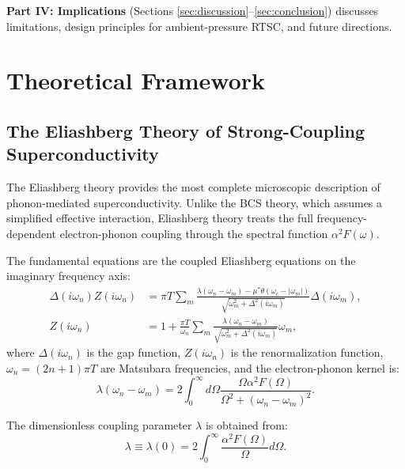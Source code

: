 \documentclass[11pt,a4paper]{article}
\theoremstyle{definition}
\begin{document}
\textbf{Part IV: Implications} (Sections \ref{sec:discussion}--\ref{sec:conclusion}) discusses limitations, design principles for ambient-pressure RTSC, and future directions.

\section{Theoretical Framework}\label{sec:theory}

\subsection{The Eliashberg Theory of Strong-Coupling Superconductivity}

The Eliashberg theory \cite{eliashberg1960,eliashberg1960b} provides the most complete microscopic description of phonon-mediated superconductivity. Unlike the BCS theory, which assumes a simplified effective interaction, Eliashberg theory treats the full frequency-dependent electron-phonon coupling through the spectral function $\alpha^2F(\omega)$.

The fundamental equations are the coupled Eliashberg equations on the imaginary frequency axis:
\begin{align}
\Delta(i\omega_n)Z(i\omega_n) &= \pi T \sum_m \frac{\lambda(\omega_n - \omega_m) - \mu^*\theta(\omega_c - |\omega_m|)}{\sqrt{\omega_m^2 + \Delta^2(i\omega_m)}} \Delta(i\omega_m), \label{eq:eliashberg1}\\
Z(i\omega_n) &= 1 + \frac{\pi T}{\omega_n} \sum_m \frac{\lambda(\omega_n - \omega_m)}{\sqrt{\omega_m^2 + \Delta^2(i\omega_m)}} \omega_m, \label{eq:eliashberg2}
\end{align}
where $\Delta(i\omega_n)$ is the gap function, $Z(i\omega_n)$ is the renormalization function, $\omega_n = (2n+1)\pi T$ are Matsubara frequencies, and the electron-phonon kernel is:
\begin{equation}\label{eq:lambda_omega}
\lambda(\omega_n - \omega_m) = 2\int_0^\infty d\Omega \frac{\Omega \alpha^2F(\Omega)}{\Omega^2 + (\omega_n - \omega_m)^2}.
\end{equation}

The dimensionless coupling parameter $\lambda$ is obtained from:
\begin{equation}\label{eq:lambda}
\lambda \equiv \lambda(0) = 2\int_0^\infty \frac{\alpha^2F(\Omega)}{\Omega} d\Omega.
\end{equation}
\end{document}
